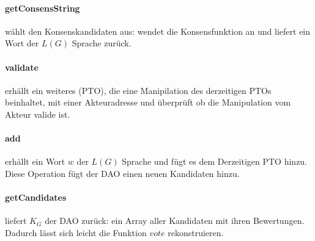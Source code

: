 \documentclass[a4paper,12pt]{report}
\begin{document}
\paragraph*{getConsensString}
wählt den Konsenskandidaten aus:
wendet die Konsensfunktion an und liefert ein Wort der $L(G)$ Sprache zurück.

\paragraph*{validate}
erhällt ein weiteres (PTO), die eine Manipilation des derzeitigen PTOs beinhaltet, mit einer Akteuradresse und überprüft ob die Manipulation vom Akteur valide ist.

\paragraph*{add}
erhällt ein Wort $w$ der $L(G)$ Sprache und fügt es dem Derzeitigen PTO hinzu. Diese Operation fügt der DAO einen neuen Kandidaten hinzu.

\paragraph*{getCandidates}
liefert $K_G$ der DAO zurück: ein Array aller Kandidaten mit ihren Bewertungen. Dadurch lässt sich leicht die Funktion $vote$ rekonstruieren.




\end{document}
